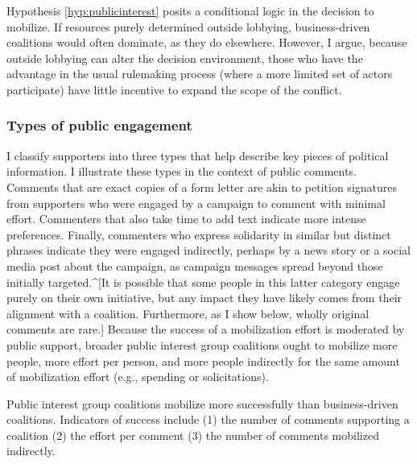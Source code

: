 \begin{subhyp}
Hypothesis \ref{hyp:publicinterest} posits a conditional logic in the decision to mobilize. If resources purely determined outside lobbying, business-driven coalitions would often dominate, as they do elsewhere. However, I argue, because outside lobbying can alter the decision environment, those who have the advantage in the usual rulemaking process (where a more limited set of actors participate) have little incentive to expand the scope of the conflict.








\subsubsection{Types of public engagement} I classify supporters into three types that help describe key pieces of political information. I illustrate these types in the context of public comments. Comments that are exact copies of a form letter are akin to petition signatures from supporters who were engaged by a campaign to comment with minimal effort. Commenters that also take time to add text indicate more intense preferences. Finally, commenters who express solidarity in similar but distinct phrases indicate they were engaged indirectly, perhaps by a news story or a social media post about the campaign, as campaign messages spread beyond those initially targeted.^[It is possible that some people in this latter category engage purely on their own initiative, but any impact they have likely comes from their alignment with a coalition. Furthermore, as I show below, wholly original comments are rare.] Because the success of a mobilization effort is moderated by public support, broader public interest group coalitions ought to mobilize more people, more effort per person, and more people indirectly for the same amount of mobilization effort (e.g., spending or solicitations).  

\begin{hyp}
Public interest group coalitions mobilize more successfully than business-driven coalitions. Indicators of success include (1) the number of comments supporting a coalition (2) the effort per comment (3) the number of comments mobilized indirectly. 
\end{hyp}

\end{subhyp}

